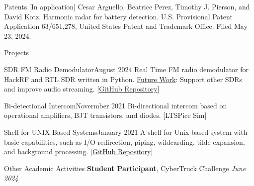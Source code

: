 \documentclass{resume} %
\begin{document}
\begin{rSection}{Patents}
[In application] Cesar Arguello, Beatrice Perez, Timothy J. Pierson, and David Kotz. Harmonic radar for battery detection. U.S. Provisional Patent Application 63/651,278, United States Patent and Trademark Office. Filed May 23, 2024. 
\end{rSection}
\begin{rSection}{Projects}
\begin{rSubsection_project}{SDR FM Radio Demodulator}{August 2024}
Real Time FM radio demodulator for HackRF and RTL SDR written in Python. \underline{Future Work}: Support other SDRs and improve audio streaming. [\href{https://github.com/carguelloM/sdr-fm-radio}{GitHub Repository}]
\end{rSubsection_project}

\begin{rSubsection_project}{Bi-detectional Intercom}{Novermber 2021}
Bi-directional intercom based on operational amplifiers, BJT transistors, and diodes. [LTSPice Sim]
\end{rSubsection_project}

\begin{rSubsection_project}{Shell for UNIX-Based Systems}{January 2021}
A shell for Unix-based system with basic capabilities, such as
I/O redirection, piping, wildcarding, tilde-expansion, and background processing. [\href{https://github.com/carguelloM/CPshell}{GitHub Repository}]
\end{rSubsection_project}


\end{rSection}

\begin{rSection}{Other Academic Activities}
\textbf{Student Participant}, CyberTruck Challenge \hfill \textit{June 2024}
\end{rSection}
\end{document}
